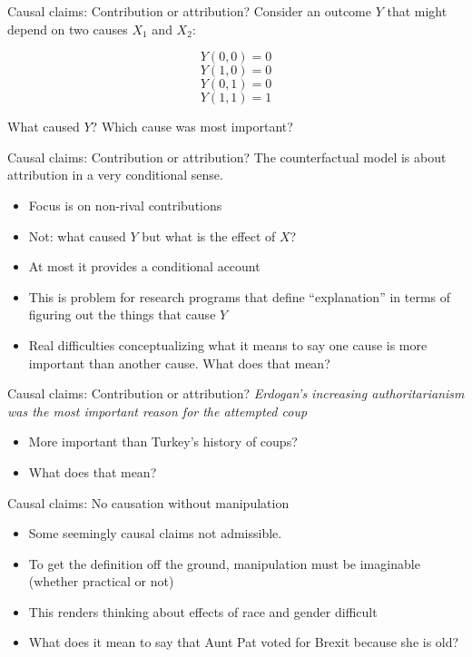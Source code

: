 \documentclass[
  11pt,
  ignorenonframetext,
]{beamer}
\providecommand{\tightlist}{%
  \setlength{\itemsep}{0pt}\setlength{\parskip}{0pt}}\usepackage{longtable,booktabs,array}
\begin{document}
\begin{frame}{Causal claims: Contribution or attribution?}
\protect\hypertarget{causal-claims-contribution-or-attribution-1}{}
Consider an outcome \(Y\) that might depend on two causes \(X_1\) and
\(X_2\):

\[Y(0,0) = 0\] \[Y(1,0) = 0\] \[Y(0,1) = 0\] \[Y(1,1) = 1\]

What caused \(Y\)? Which cause was most important?
\end{frame}

\begin{frame}{Causal claims: Contribution or attribution?}
\protect\hypertarget{causal-claims-contribution-or-attribution-2}{}
The counterfactual model is about attribution in a very conditional
sense.

\begin{itemize}
\item
  Focus is on non-rival contributions
\item
  Not: what caused \(Y\) but what is the effect of \(X\)?
\item
  At most it provides a conditional account
\item
  This is problem for research programs that define ``explanation'' in
  terms of figuring out the things that cause \(Y\)
\item
  Real difficulties conceptualizing what it means to say one cause is
  more important than another cause. What does that mean?
\end{itemize}
\end{frame}

\begin{frame}{Causal claims: Contribution or attribution?}
\protect\hypertarget{causal-claims-contribution-or-attribution-3}{}
\emph{Erdogan's increasing authoritarianism was the most important
reason for the attempted coup}

\begin{itemize}
\tightlist
\item
  More important than Turkey's history of coups?
\item
  What does that mean?
\end{itemize}
\end{frame}

\begin{frame}{Causal claims: No causation without manipulation}
\protect\hypertarget{causal-claims-no-causation-without-manipulation}{}
\begin{itemize}
\tightlist
\item
  Some seemingly causal claims not admissible.
\item
  To get the definition off the ground, manipulation must be imaginable
  (whether practical or not)
\item
  This renders thinking about effects of race and gender difficult
\item
  What does it mean to say that Aunt Pat voted for Brexit because she is
  old?
\end{itemize}
\end{frame}
\end{document}
